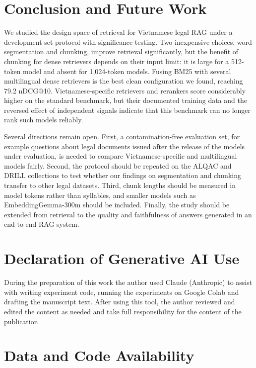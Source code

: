 \documentclass{ws-vjcs}
\begin{document}
\section{Conclusion and Future Work}

We studied the design space of retrieval for Vietnamese legal RAG under a development-set protocol with significance testing. Two inexpensive choices, word segmentation and chunking, improve retrieval significantly, but the benefit of chunking for dense retrievers depends on their input limit: it is large for a 512-token model and absent for 1,024-token models. Fusing BM25 with several multilingual dense retrievers is the best clean configuration we found, reaching 79.2 nDCG@10. Vietnamese-specific retrievers and rerankers score considerably higher on the standard benchmark, but their documented training data and the reversed effect of independent signals indicate that this benchmark can no longer rank such models reliably.

Several directions remain open. First, a contamination-free evaluation set, for example questions about legal documents issued after the release of the models under evaluation, is needed to compare Vietnamese-specific and multilingual models fairly. Second, the protocol should be repeated on the ALQAC and DRILL collections to test whether our findings on segmentation and chunking transfer to other legal datasets. Third, chunk lengths should be measured in model tokens rather than syllables, and smaller models such as EmbeddingGemma-300m should be included. Finally, the study should be extended from retrieval to the quality and faithfulness of answers generated in an end-to-end RAG system.

\section*{Declaration of Generative AI Use}

During the preparation of this work the author used Claude (Anthropic) to assist with writing experiment code, running the experiments on Google Colab and drafting the manuscript text. After using this tool, the author reviewed and edited the content as needed and take full responsibility for the content of the publication.

\section*{Data and Code Availability}
\end{document}
